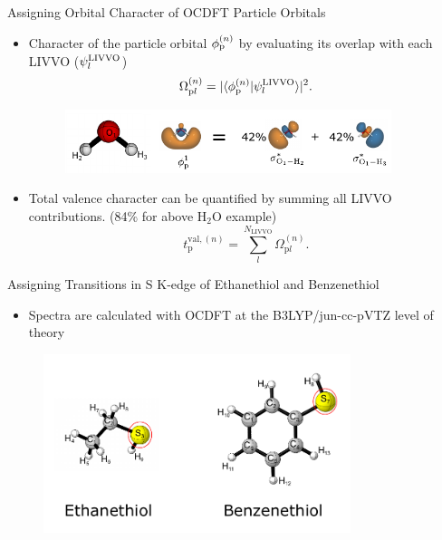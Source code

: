 \documentclass[t]{beamer}
\begin{document}
\begin{frame}{Assigning Orbital Character of OCDFT Particle Orbitals}
\begin{itemize}
\item Character of the particle orbital $\phi_{\rm p}^{(n)}$ by evaluating its overlap with each LIVVO ($\psi^{\rm LIVVO}_l$)
\begin{equation}
\label{eq:part_livvo_overlap}
\Omega_{\mathrm{p}l}^{(n)} = | \langle \phi^{(n)}_\mathrm{p} | \psi^{\rm LIVVO}_l \rangle |^2.
\end{equation}
\begin{figure}
\vspace{-5mm}
\centering
\includegraphics[width=0.9\textwidth]{water_example.pdf}
\end{figure}
\item Total valence character can be quantified by summing all LIVVO contributions. (84\% for above H$_2$O example)
\begin{equation}
t^{\mathrm{val},(n)}_\mathrm{p} = \sum_{l}^{N_\mathrm{LIVVO}} \Omega_{\mathrm{p}l}^{(n)}.
\end{equation}
\end{itemize}
\end{frame}

\begin{frame}{Assigning Transitions in S K-edge of Ethanethiol and Benzenethiol}
\begin{itemize}
\item Spectra are calculated with OCDFT at the B3LYP/jun-cc-pVTZ level of theory
\end{itemize}
\begin{figure}
\includegraphics[width=0.8\textwidth]{ethane_benzenethiol_header.pdf}
\end{figure}
\end{frame}
\end{document}
